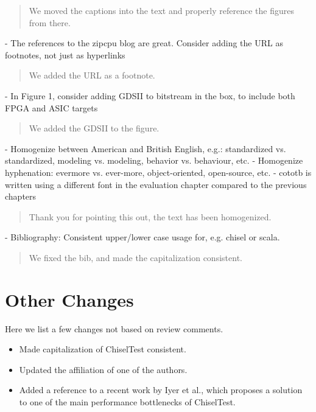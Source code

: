 \documentclass{article}
\newcommand{\todo}[1]{{\color{olive} TODO: #1}}
\newcommand{\reply}[1]{{\color{blue} #1}}
\begin{document}
\begin{quote}
\reply{
We moved the captions into the text and properly reference the figures from there.
}
\end{quote}


- The references to the zipcpu blog are great. Consider adding the URL as footnotes, not just as hyperlinks

\begin{quote}
\reply{
We added the URL as a footnote.
}\end{quote}

- In Figure 1, consider adding GDSII to bitstream in the box, to include both FPGA and ASIC targets

\begin{quote}
\reply{
We added the GDSII to the figure.
}\end{quote}

- Homogenize between American and British English, e.g.: standardized vs. standardized, modeling vs. modeling, behavior vs. behaviour, etc.
- Homogenize hyphenation: evermore vs. ever-more, object-oriented, open-source, etc.
- cototb is written using a different font in the evaluation chapter compared to the previous chapters
\begin{quote}
\reply{Thank you for pointing this out, the text has been homogenized.}
\end{quote}

- Bibliography: Consistent upper/lower case usage for, e.g. chisel or scala.

\begin{quote}
\reply{
We fixed the bib, and made the capitalization consistent.
}\end{quote}



\section*{Other Changes}

Here we list a few changes not based on review comments.

\begin{itemize}
	\item Made capitalization of ChiselTest consistent.
	\item Updated the affiliation of one of the authors.
	\item Added a reference to a recent work by Iyer et al., which proposes a solution to one of the main performance bottlenecks of ChiselTest.
\end{itemize}
\end{document}

